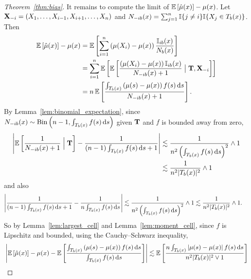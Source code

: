 \begin{proof}[Theorem~\ref{thm:bias}]

  It remains to compute the limit of
  $\mathbb{E} \left[ \hat \mu(x) \right] - \mu(x)$.
  Let $\mathbf{X}_{-i} = (X_1, \ldots, X_{i-1}, X_{i+1}, \ldots, X_n)$
  and $N_{-i b}(x) = \sum_{j=1}^n \mathbb{I}\{j \neq i\} \mathbb{I}\{X_j \in T_b(x)\}$.
  Then
  \begin{align*}
    \mathbb{E} \left[ \hat \mu(x) \right]
    - \mu(x)
    &=
    \mathbb{E} \left[
      \sum_{i=1}^{n}
      \left( \mu(X_i) - \mu(x) \right)
      \frac{\mathbb{I}_{i b}(x)}{N_b(x)}
    \right] \\
    &=
    \sum_{i=1}^{n}
    \mathbb{E} \left[
      \mathbb{E} \left[
        \frac{\left( \mu(X_i) - \mu(x) \right)\mathbb{I}_{i b}(x)}
        {N_{-i b}(x) + 1}
        \bigm| \mathbf{T}, \mathbf{X}_{-i}
      \right]
    \right] \\
    &=
    n \,
    \mathbb{E} \left[
      \frac{\int_{T_b(x)} \left( \mu(s) - \mu(x) \right) f(s) \,\mathrm{d}s}
      {N_{-i b}(x) + 1}
    \right].
  \end{align*}
  By Lemma~\ref{lem:binomial_expectation}, since
  $N_{-i b}(x) \sim \operatorname{Bin}\left(n-1,
  \int_{T_b(x)} f(s) \,\mathrm{d}s \right)$
  given $\mathbf{T}$
  and $f$ is bounded away from zero,
  \begin{align*}
    \left|
    \mathbb{E} \left[
      \frac{1}{N_{-i b}(x) + 1}
      \Bigm| \mathbf{T}
    \right]
    - \frac{1}{(n-1) \int_{T_b(x)} f(s) \,\mathrm{d}s + 1}
    \right|
    &\lesssim
    \frac{1}{n^2 \left( \int_{T_b(x)} f(s) \,\mathrm{d}s \right)^2}
    \wedge 1 \\
    &\lesssim
    \frac{1}{n^2 |T_b(x)|^2}
    \wedge 1
  \end{align*}
  and also
  \begin{align*}
    \left|
    \frac{1}{(n-1) \int_{T_b(x)} f(s) \,\mathrm{d}s + 1}
    - \frac{1}{n \int_{T_b(x)} f(s) \,\mathrm{d}s}
    \right|
    &\lesssim
    \frac{1}{n^2 \left( \int_{T_b(x)} f(s) \,\mathrm{d}s\right)^2}
    \wedge 1
    \lesssim
    \frac{1}{n^2 |T_b(x)|^2}
    \wedge 1.
  \end{align*}
  So by Lemma~\ref{lem:largest_cell}
  and Lemma~\ref{lem:moment_cell},
  since $f$ is Lipschitz and bounded,
  using the Cauchy--Schwarz inequality,
  \begin{align*}
    &\left|
    \E \left[ \hat \mu(x) \right]
    - \mu(x)
    - \E \left[
      \frac{\int_{T_b(x)} \left( \mu(s) - \mu(x) \right) f(s) \diff s}
      {\int_{T_b(x)} f(s) \diff s}
    \right]
    \right|
    \lesssim
    \E \left[
      \frac{n \int_{T_b(x)} \left| \mu(s) - \mu(x) \right| f(s) \diff s}
      {n^2 |T_b(x)|^2 \vee 1}
    \right] \\

\end{align*}
\end{proof}
